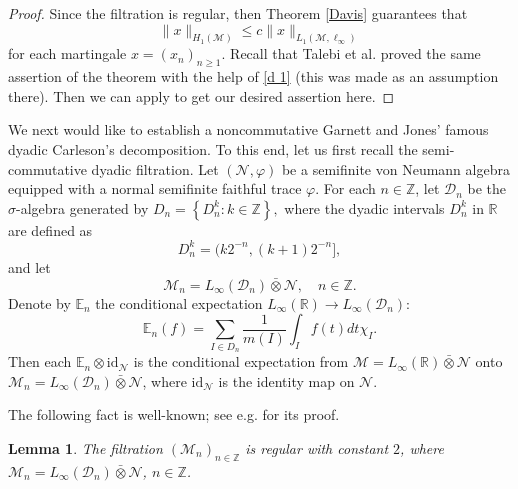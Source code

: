 \documentclass[11]{amsart}
\numberwithin{equation}{section}
\newtheorem{lemma}[theorem]{Lemma}
\begin{document}
\begin{proof}
Since the filtration is regular, then Theorem \ref{Davis} guarantees that
\begin{equation}\label{d 1}
\|x\|_{H_1(\mathcal{M})}\leq c\|x\|_{L_1(\mathcal{M},\ell_{\infty})}
\end{equation}
 for each martingale $x=(x_n)_{n\geq1}$.
Recall that Talebi et al.   \cite[Theorem 2.3]{TMS2019} proved the same assertion of the theorem with the help of  \eqref{d 1} (this was made as an assumption there).
Then we can apply \cite[Theorem 2.3]{TMS2019}  to get our desired assertion here.  
\end{proof}

We next would like to establish a noncommutative Garnett and Jones' famous dyadic Carleson's decomposition. To this end, let us first recall the semi-commutative dyadic filtration. Let $(\mathcal{N},\varphi)$ be a semifinite von Neumann algebra equipped with a normal semifinite faithful trace $\varphi$. 
 For each $n\in\mathbb{Z}$, let $\mathcal{D}_{n}$ be the $\sigma$-algebra generated by
$D_n=\left\{D_n^{k}: k\in \mathbb{Z}\right\},$
where the dyadic intervals $D_n^{k}$ in $\mathbb{R}$ are defined   as
\begin{equation}
D_n^{k}=(k2^{-n}, (k+1)2^{-n}],
\end{equation}
and let 
\begin{equation}\label{dyadic Mn}
\mathcal{M}_n=L_{\infty}(\mathcal{D}_n)\bar{\otimes} \mathcal{N},\quad n\in\mathbb{Z}.
\end{equation}
Denote by $\mathbb{E}_n$ the conditional expectation $L_{\infty}(\mathbb{R})\to L_{\infty}(\mathcal{D}_n)$:
$$\mathbb{E}_n(f)=\sum_{I\in D_n}\frac{1}{m(I)}\int_If(t)dt\chi_I.$$
Then each $\mathbb{E}_n\otimes \mathrm{id}_{\mathcal{N}}$ is the conditional expectation from $\mathcal{M}=L_{\infty}(\mathbb{R})\bar{\otimes} \mathcal{N}$ onto $ \mathcal{M}_n= L_{\infty}(\mathcal{D}_n)\bar{\otimes} \mathcal{N}$, where $\mathrm{id}_{\mathcal{N}}$ is the identity map on $\mathcal{N}$.  

The following fact is well-known; see e.g. \cite[p.\,561]{Parcet2} for its proof.

\begin{lemma}
	The filtration $(\mathcal{M}_n)_{n\in\mathbb{Z}}$ is regular with constant $2$, where $\mathcal{M}_n=L_{\infty}(\mathcal{D}_n)\bar{\otimes} \mathcal{N}$, $n\in\mathbb{Z}$.
\end{lemma}
\end{document}
